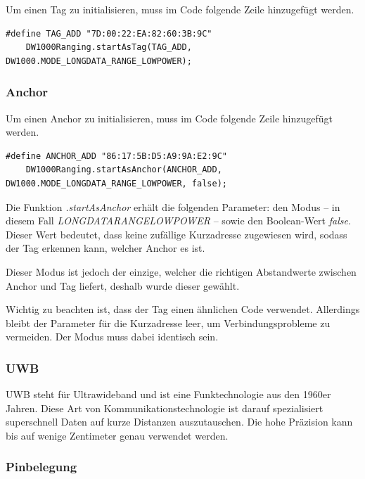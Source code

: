 Um einen Tag zu initialisieren, muss im Code folgende Zeile hinzugefügt werden.
\begin{lstlisting}[style=C++, caption=Tag Initialisierung, captionpos=b]
	#define TAG_ADD "7D:00:22:EA:82:60:3B:9C"
	DW1000Ranging.startAsTag(TAG_ADD, DW1000.MODE_LONGDATA_RANGE_LOWPOWER);
\end{lstlisting}  

\subsubsection{Anchor}

Um einen Anchor zu initialisieren, muss im Code folgende Zeile hinzugefügt werden.
\begin{lstlisting}[style=C++, caption=Anchor Initialisierung, captionpos=b]
	#define ANCHOR_ADD "86:17:5B:D5:A9:9A:E2:9C"
	DW1000Ranging.startAsAnchor(ANCHOR_ADD, DW1000.MODE_LONGDATA_RANGE_LOWPOWER, false);
\end{lstlisting} 

Die Funktion \textit{.startAsAnchor} erhält die folgenden Parameter: den Modus – in diesem Fall \textit{LONGDATA\textunderscore RANGE\textunderscore LOWPOWER} – sowie den Boolean-Wert \textit{false}. Dieser Wert bedeutet, dass keine zufällige Kurzadresse zugewiesen wird, sodass der Tag erkennen kann, welcher Anchor es ist.

Dieser Modus ist jedoch der einzige, welcher die richtigen Abstandwerte zwischen Anchor und Tag liefert, deshalb wurde dieser gewählt.

Wichtig zu beachten ist, dass der Tag einen ähnlichen Code verwendet. Allerdings bleibt der Parameter für die Kurzadresse leer, um Verbindungsprobleme zu vermeiden. Der Modus muss dabei identisch sein.

\subsubsection{UWB}

UWB steht für Ultrawideband und ist eine Funktechnologie aus den 1960er Jahren. Diese Art von Kommunikationstechnologie ist darauf spezialisiert superschnell Daten auf kurze Distanzen auszutauschen. Die hohe Präzision kann bis auf wenige Zentimeter genau verwendet werden. \parencite{UWB}

\subsubsection{Pinbelegung}

